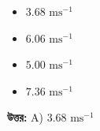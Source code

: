 \documentclass[12pt, a4paper]{article}
\begin{document}
\begin{itemize}[label={}, leftmargin=1cm, itemsep=0.5em]
\item[\textbf{A)}]  $3.68\text{ ms}^{-1}$
\item[\textbf{B)}]  $6.06\text{ ms}^{-1}$
\item[\textbf{C)}] $5.00\text{ ms}^{-1}$
\item[\textbf{D)}]  $7.36\text{ ms}^{-1}$
\end{itemize}

\vspace{0.5em}
\begin{tcolorbox}[answerbox]
\textbf{\color{success} উত্তর:} A)  $3.68\text{ ms}^{-1}$
\end{tcolorbox}
\vspace{1em}
\end{document}

